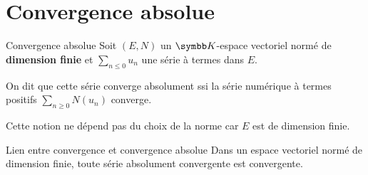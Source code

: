 \section{Convergence absolue}

\begin{definition}{Convergence absolue}{}
    Soit $(E, N)$ un $\K$-espace vectoriel normé de \textbf{dimension finie} et $\sum_{n \leqslant 0} u_n$
    une série à termes dans $E$. 

    On dit que cette série converge absolument ssi la série numérique à termes positifs 
    $\sum_{n \geqslant 0} N(u_n)$ converge. 
\end{definition}

\begin{remarque}
    Cette notion ne dépend pas du choix de la norme car $E$ est de dimension finie.
\end{remarque}

\begin{theoreme}{Lien entre convergence et convergence absolue}{}
    Dans un espace vectoriel normé de dimension finie, toute série absolument convergente est convergente.
\end{theoreme}


